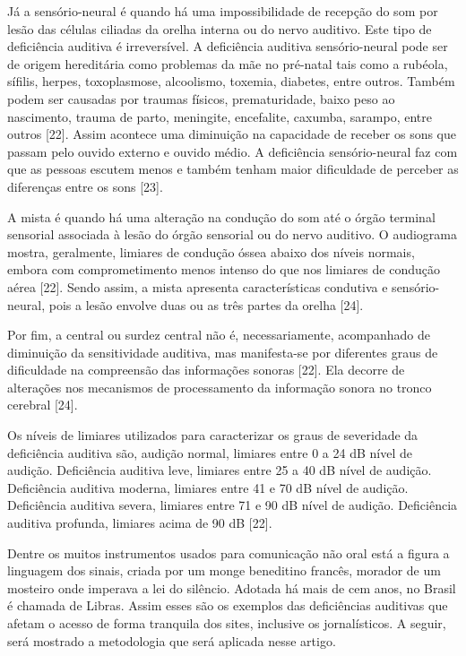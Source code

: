 \documentclass[a4paper]{article}
\begin{document}
\begin{titlepage}
Já a sensório-neural é quando há uma impossibilidade de recepção do som por lesão das células ciliadas da orelha interna ou do nervo auditivo. Este tipo de deficiência auditiva é irreversível. A deficiência auditiva sensório-neural pode ser de origem hereditária como problemas da mãe no pré-natal tais como a rubéola, sífilis, herpes, toxoplasmose, alcoolismo, toxemia, diabetes, entre outros. Também podem ser causadas por traumas físicos, prematuridade, baixo peso ao nascimento, trauma de parto, meningite, encefalite, caxumba, sarampo, entre outros [22]. Assim acontece uma diminuição na capacidade de receber os sons que passam pelo ouvido externo e ouvido médio. A deficiência sensório-neural faz com que as pessoas escutem menos e também tenham maior dificuldade de perceber as diferenças entre os sons [23].

A mista é quando há uma alteração na condução do som até o órgão terminal sensorial associada à lesão do órgão sensorial ou do nervo auditivo. O audiograma mostra, geralmente, limiares de condução óssea abaixo dos níveis normais, embora com comprometimento menos intenso do que nos limiares de condução aérea [22]. Sendo assim, a mista apresenta características condutiva e sensório-neural, pois a lesão envolve duas ou as três partes da orelha [24].

Por fim, a central ou surdez central não é, necessariamente, acompanhado de diminuição da sensitividade auditiva, mas manifesta-se por diferentes graus de dificuldade na compreensão das informações sonoras [22]. Ela decorre de alterações nos mecanismos de processamento da informação sonora no tronco cerebral [24].

Os níveis de limiares utilizados para caracterizar os graus de severidade da deficiência auditiva são, audição normal, limiares entre 0 a 24 dB nível de audição. Deficiência auditiva leve, limiares entre 25 a 40 dB nível de audição. Deficiência auditiva moderna, limiares entre 41 e 70 dB nível de audição. Deficiência auditiva severa, limiares entre 71 e 90 dB nível de audição. Deficiência auditiva profunda, limiares acima de 90 dB [22].

Dentre os muitos instrumentos usados para comunicação não oral está a figura a linguagem dos sinais, criada por um monge beneditino francês, morador de um mosteiro onde imperava a lei do silêncio. Adotada há mais de cem anos, no Brasil é chamada de Libras. Assim esses são os exemplos das deficiências auditivas que afetam o acesso de forma tranquila dos sites, inclusive os jornalísticos. A seguir, será mostrado a metodologia que será aplicada nesse artigo.


\end{titlepage}
\end{document}
